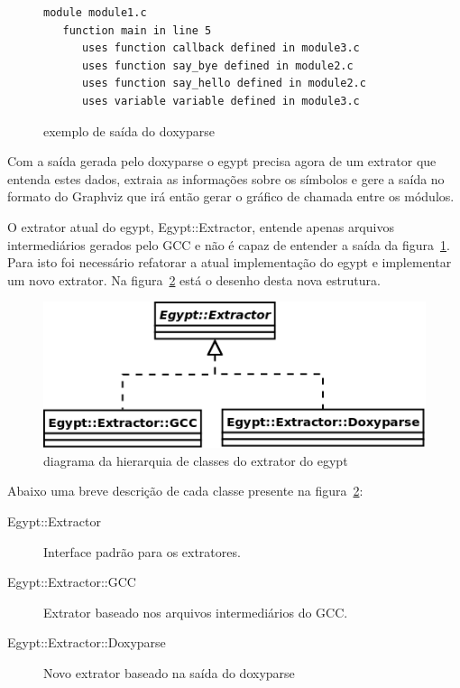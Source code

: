 \begin{figure}[h]
\begin{Verbatim}[frame=single,fontsize=\relsize{-2},fontfamily=courier]
module module1.c
   function main in line 5
      uses function callback defined in module3.c
      uses function say_bye defined in module2.c
      uses function say_hello defined in module2.c
      uses variable variable defined in module3.c
\end{Verbatim}
\caption{exemplo de saída do doxyparse}
\label{exemplo-saida-doxyparse}
\end{figure}

Com a saída gerada pelo doxyparse o egypt precisa agora de um extrator que
entenda estes dados, extraia as informações sobre os símbolos e gere a saída no
formato do Graphviz que irá então gerar o gráfico de chamada entre os módulos.

O extrator atual do egypt, Egypt::Extractor, entende apenas arquivos
intermediários gerados pelo GCC e não é capaz de entender a saída da
figura~\ref{exemplo-saida-doxyparse}. Para isto foi necessário refatorar a
atual implementação do egypt e implementar um novo extrator. Na
figura~\ref{egypt-diagram-extractor} está o desenho desta nova estrutura.

\begin{figure}[h]
\center
\includegraphics[scale=0.4]{imagens/egypt-diagram-extractor}
\caption{diagrama da hierarquia de classes do extrator do egypt}
\label{egypt-diagram-extractor}
\end{figure}

Abaixo uma breve descrição de cada classe presente na
figura~\ref{egypt-diagram-extractor}:

\begin{description}
\item[Egypt::Extractor] Interface padrão para os extratores.
\item[Egypt::Extractor::GCC] Extrator baseado nos arquivos intermediários do GCC.
\item[Egypt::Extractor::Doxyparse] Novo extrator baseado na saída do doxyparse
\end{description}

